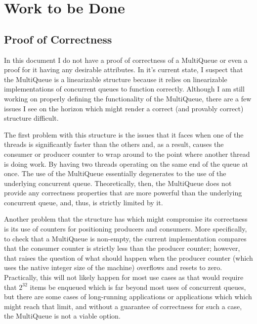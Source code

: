 \documentclass[12pt]{report}
\begin{document}
\begin{scriptsize}
\begin{algorithm}[H]
{}
\end{algorithm}
\end{scriptsize}





\section{Work to be Done}
\subsection{Proof of Correctness}
In this document I do not have a proof of correctness of a MultiQueue or even a
proof for it having any desirable attributes. In it's current state, I suspect
that the MultiQueue is a linearizable structure because it relies on
linearizable implementations of concurrent queues to function correctly.
Although I am still working on properly defining the functionality of the
MultiQueue, there are a few issues I see on the horizon which might render a
correct (and provably correct) structure difficult.

The first problem with this structure is the issues that it faces when one of
the threads is significantly faster than the others and, as a result, causes
the consumer or producer counter to wrap around to the point where another
thread is doing work. By having two threads operating on the same end of the
queue at once. The use of the MultiQueue essentially degenerates to the use of
the underlying concurrent queue. Theoretically, then, the MultiQueue does not
provide any correctness properties that are more powerful than the underlying
concurrent queue, and, thus, is strictly limited by it.

Another problem that the structure has which might compromise its correctness
is its use of counters for positioning producers and consumers. More
specifically, to check that a MultiQueue is non-empty, the current
implementation compares that the consumer counter is strictly less than the
producer counter; however, that raises the question of what should happen when
the producer counter (which uses the native integer size of the machine)
overflows and resets to zero. Practically, this will not likely happen for most
use cases as that would require that $2^{32}$ items be enqueued which is far
beyond most uses of concurrent queues, but there are some cases of long-running
applications or applications which which might reach that limit, and without a
guarantee of correctness for such a case, the MultiQueue is not a viable
option.
\end{document}
